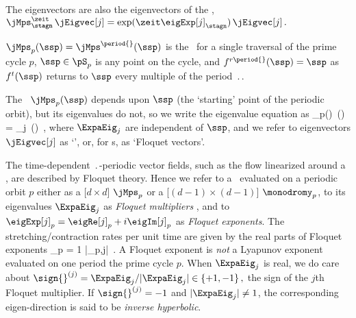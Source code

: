 The eigenvectors are also the eigenvectors of the \jacobianM,
\( %
\jMps^\zeit_\stagn \, \jEigvec[j]
   = \exp({\zeit\eigExp[j]_\stagn })\,\jEigvec[j]
\,.
\) %

$\jMps_{p}(\ssp) = \jMps^\period{}(\ssp)$ is the \jacobianM\
for a single traversal of the prime cycle $p$, $\ssp \in \pS_p$ is
any point on the cycle, and $f^{r\period{}}(\ssp)=\ssp$ as
$f^{t}(\ssp)$ returns to $\ssp$ every multiple of the period
$\period{}$.

The \jacobianM\ $\jMps_p(\ssp)$ depends upon $\ssp$ (the
`starting' point of the periodic orbit),
but its eigenvalues do not, so we
write the eigenvalue equation as
\beq
\jMps_{p}(\ssp)\, \jEigvec[j](\ssp)
   = \ExpaEig_{j} \,\jEigvec[j] (\ssp)
\,,
where $\ExpaEig_{j}$ are independent of $\ssp$, and we refer to
eigen\-vectors $\jEigvec[j]$ as `{\cLvs}', or, for \po s,
as `Floquet vectors'.

The time-dependent $\period{}$-periodic vector fields, such as the
flow linearized around a \po, are described by Floquet theory. Hence
we refer to a \jacobianM\ evaluated on a periodic
orbit $p$ either as a [$d\!\times\!d$] {\em \FloquetM} $\jMps_p$ or a
 [$(d\!-\!1)\times(d\!-\!1)$] {\em \monodromyM} $\monodromy_p$, to its
eigenvalues $\ExpaEig_{j}$ as \emph{Floquet multipliers}
, and to $\eigExp[j]_p = \eigRe[j]_p+i\eigIm[j]_p$
as \emph{Floquet exponents}.
The stretching/contraction rates per unit time
are given by the real parts of {Floquet exponents}
\beq
\eigRe[j]_p = {1 \over {}} \ln \left|\ExpaEig_{p,j}\right|
\,.
A Floquet exponent is \emph{not} a Lyapunov
exponent evaluated on one period the prime cycle $p$.
When $\ExpaEig_{j}$ is real, we do care about
\(\sign{}^{(j)}
     =   \ExpaEig_{j}/|\ExpaEig_{j}|
     \in \{+1,-1\}
\,,
\)
the sign of the $j$th Floquet multiplier.
If $\sign{}^{(j)}  = -1$ and $|\ExpaEig_{j}| \neq 1$, the corresponding
eigen-direction is said to be {\em inverse hyperbolic}.

